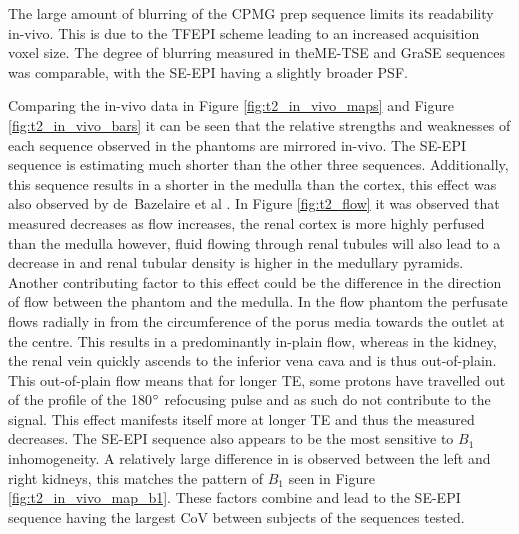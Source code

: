 The large amount of blurring of the \ac{CPMG} \ttwo prep sequence limits its readability in-vivo. This is due to the \ac{TFEPI} scheme leading to an increased acquisition voxel size. The degree of blurring measured in the\ac{ME-TSE} and \ac{GraSE} sequences was comparable, with the \ac{SE}-\ac{EPI} having a slightly broader \ac{PSF}.

Comparing the in-vivo data in Figure \ref{fig:t2_in_vivo_maps} and Figure \ref{fig:t2_in_vivo_bars} it can be seen that the relative strengths and weaknesses of each sequence observed in the phantoms are mirrored in-vivo. The \ac{SE}-\ac{EPI} sequence is estimating much shorter \ttwo than the other three sequences. Additionally, this sequence results in a shorter \ttwo in the medulla than the cortex, this effect was also observed by de~Bazelaire et al \cite{de_bazelaire_mr_2004}. In Figure \ref{fig:t2_flow} it was observed that measured \ttwo decreases as flow increases, the renal cortex is more highly perfused than the medulla \cite{buchanan_quantitative_2019, nery_consensus-based_2020} however, fluid flowing through renal tubules will also lead to a decrease in \ttwo and renal tubular density is higher in the medullary pyramids. Another contributing factor to this effect could be the difference in the direction of flow between the phantom and the medulla. In the flow phantom the perfusate flows radially in from the circumference  of the porus media towards the outlet at the centre. This results in a predominantly in-plain flow, whereas in the kidney, the renal vein quickly ascends to the inferior vena cava and is thus out-of-plain. This out-of-plain flow means that for longer \ac{TE}, some protons have travelled out of the profile of the 180$\degree$ refocusing pulse and as such do not contribute to the signal. This effect manifests itself more at longer \ac{TE} and thus the measured \ttwo decreases. The \ac{SE}-\ac{EPI} sequence also appears to be the most sensitive to $B_1$ inhomogeneity. A relatively large difference in \ttwo is observed between the left and right kidneys, this matches the pattern of $B_1$ seen in Figure \ref{fig:t2_in_vivo_map_b1}. These factors combine and lead to the \ac{SE}-\ac{EPI} sequence having the largest \ac{CoV} between subjects of the sequences tested.

